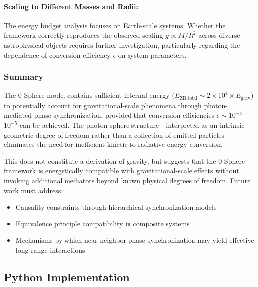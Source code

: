 \documentclass[%
 reprint,
 amsmath,amssymb,
 aps,
 prb,
]{revtex4-2}
\numberwithin{equation}{section}
\begin{document}
\vspace{0.5cm}

\paragraph{Scaling to Different Masses and Radii:}
The energy budget analysis focuses on Earth-scale systems. Whether the framework correctly reproduces the observed scaling $g \propto M/R^2$ across diverse astrophysical objects requires further investigation, particularly regarding the dependence of conversion efficiency $\epsilon$ on system parameters.

\subsubsection{Summary}

The 0-Sphere model contains sufficient internal energy ($E_{\text{ZB,total}} \sim 2 \times 10^4 \times E_{\text{grav}}$) to potentially account for gravitational-scale phenomena through photon-mediated phase synchronization, provided that conversion efficiencies $\epsilon \sim 10^{-4}$--$10^{-5}$ can be achieved. The photon sphere structure—interpreted as an intrinsic geometric degree of freedom rather than a collection of emitted particles—eliminates the need for inefficient kinetic-to-radiative energy conversion.

This does not constitute a derivation of gravity, but suggests that the 0-Sphere framework is energetically compatible with gravitational-scale effects without invoking additional mediators beyond known physical degrees of freedom. Future work must address:

\begin{itemize}
\item Causality constraints through hierarchical synchronization models
\item Equivalence principle compatibility in composite systems
\item Mechanisms by which near-neighbor phase synchronization may yield effective long-range interactions
\end{itemize}

\vspace{1.0cm}

\subsection{Python Implementation}
\label{app:code}
\end{document}
